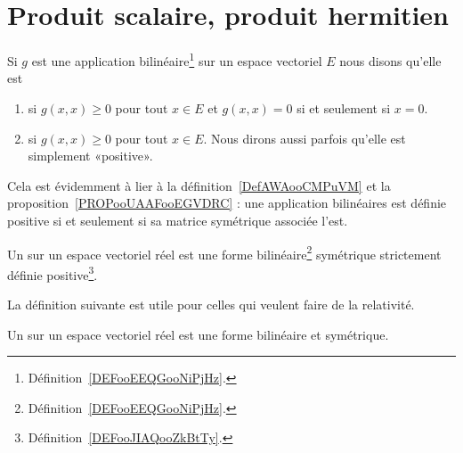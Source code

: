 
\section{Produit scalaire, produit hermitien}

\begin{definition}      \label{DEFooJIAQooZkBtTy}
    Si $g$ est une application bilinéaire\footnote{Définition~\ref{DEFooEEQGooNiPjHz}.} sur un espace vectoriel \( E\) nous disons qu'elle est
    \begin{enumerate}
        \item
             si $g(x,x)\geq 0$ pour tout $x\in E$ et $g(x,x)=0$ si et seulement si $x=0$.
        \item
             si $g(x,x)\geq 0$ pour tout $x\in E$. Nous dirons aussi parfois qu'elle est simplement «positive».
        \end{enumerate}
\end{definition}
Cela est évidemment à lier à la définition~\ref{DefAWAooCMPuVM} et la proposition~\ref{PROPooUAAFooEGVDRC} : une application bilinéaires est définie positive si et seulement si sa matrice symétrique associée l'est.

\begin{definition}\label{DefVJIeTFj}
    Un  sur un espace vectoriel réel est une forme bilinéaire\footnote{Définition~\ref{DEFooEEQGooNiPjHz}.} symétrique strictement définie positive\footnote{Définition~\ref{DEFooJIAQooZkBtTy}.}.
\end{definition}

La définition suivante est utile pour celles qui veulent faire de la relativité.
\begin{definition}
    Un  sur un espace vectoriel réel est une forme bilinéaire et symétrique.
\end{definition}

